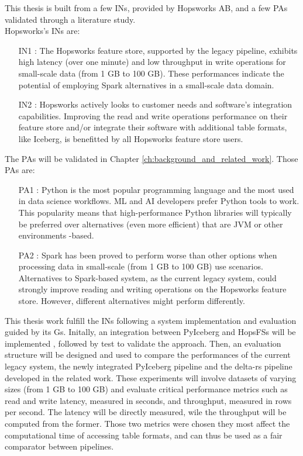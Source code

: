 This thesis is built from a few \glspl{IN}, provided by Hopsworks \gls{AB}, and a few \glspl{PA} validated through a literature study. \\ Hopsworks's \glspl{IN} are:
\begin{itemize}
    \item[IN1 :] The Hopsworks feature store, supported by the legacy pipeline, exhibits high latency (over one minute) and low throughput in write operations for small-scale data (from 1 GB to 100 GB). These performances indicate the potential of employing Spark alternatives in a small-scale data domain.
    \item[IN2 :] Hopsworks actively looks to customer needs and software's integration capabilities. Improving the read and write operations performance on their feature store and/or integrate their software with additional table formats, like Iceberg, is benefitted by all Hopsworks feature store users.
\end{itemize}
The \glspl{PA} will be validated in Chapter \ref{ch:background_and_related_work}. Those \glspl{PA} are: 
\begin{itemize}
    \item[PA1 :] Python is the most popular programming language and the most used in data science workflows. \gls{ML} and \gls{AI} developers prefer Python tools to work. This popularity means that high-performance Python libraries will typically be preferred over alternatives (even more efficient) that are \gls{JVM} or other environments -based.
    \item[PA2 :] Spark has been proved to perform worse than other options when processing data in small-scale (from 1 GB to 100 GB) use scenarios. Alternatives to Spark-based system, as the current legacy system, could strongly improve reading and writing operations on the Hopsworks feature store. However, different alternatives might perform differently.
\end{itemize}

This thesis work fulfill the \glspl{IN} following a system implementation and evaluation guided by its \glspl{G}. Initally, an integration between PyIceberg and \glspl{HopsFS} will be implemented \cite{niaziHopsFSScalingHierarchical2017}, followed by test to validate the approach. Then, an evaluation structure will be designed and used to compare the performances of the current legacy system, the newly integrated PyIceberg pipeline and the delta-rs pipeline developed in the related work. These experiments will involve datasets of varying sizes (from 1 GB to 100 GB) and evaluate critical performance metrics such as read and write latency, measured in seconds, and throughput, measured in rows per second. The latency will be directly measured, wile the throughput will be computed from the former. Those two metrics were chosen they most affect the computational time of accessing table formats, and can thus be used as a fair comparator between pipelines.